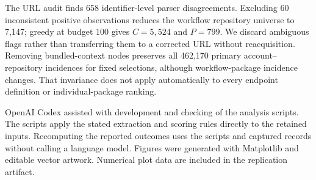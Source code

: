 The URL audit finds 658 identifier-level parser disagreements. Excluding 60 inconsistent positive observations reduces the workflow repository universe to 7,147; greedy at budget 100 gives $C=5{,}524$ and $P=799$. We discard ambiguous flags rather than transferring them to a corrected URL without reacquisition. Removing bundled-context nodes preserves all 462,170 primary account--repository incidences for fixed selections, although workflow-package incidence changes. That invariance does not apply automatically to every endpoint definition or individual-package ranking.

OpenAI Codex assisted with development and checking of the analysis scripts. The scripts apply the stated extraction and scoring rules directly to the retained inputs. Recomputing the reported outcomes uses the scripts and captured records without calling a language model. Figures were generated with Matplotlib and editable vector artwork. Numerical plot data are included in the replication artifact.
